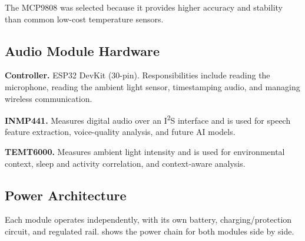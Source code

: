 \begin{designnote}
The MCP9808 was selected because it provides higher accuracy and stability than common low-cost temperature sensors.
\end{designnote}

\subsection{Audio Module Hardware}
\label{sec:audio-module-hardware}

\textbf{Controller.} ESP32 DevKit (30-pin). Responsibilities include reading the microphone, reading the ambient light sensor, timestamping audio, and managing wireless communication.

\textbf{INMP441.} Measures digital audio over an I\textsuperscript{2}S interface and is used for speech feature extraction, voice-quality analysis, and future AI models.

\textbf{TEMT6000.} Measures ambient light intensity and is used for environmental context, sleep and activity correlation, and context-aware analysis.

\subsection{Power Architecture}
\label{sec:power-architecture}

Each module operates independently, with its own battery, charging/protection circuit, and regulated rail.  shows the power chain for both modules side by side.

